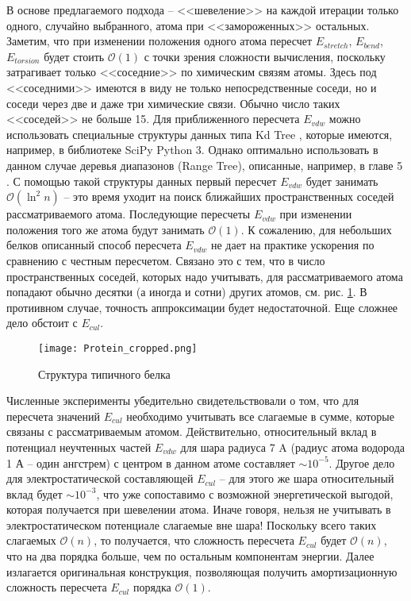   В основе предлагаемого подхода -- <<шевеление>> на каждой итерации только 
  одного, случайно выбранного, атома при <<замороженных>> остальных. Заметим, 
  что при изменении положения одного атома пересчет $E_{stretch} $, $E_{bend} 
  $, $E_{torsion} $ будет стоить $\mathcal{O}\left( 1 \right)$ с точки зрения сложности вычисления, поскольку 
  затрагивает только <<соседние>> по химическим связям атомы. Здесь под <<соседними>> 
  имеются в виду не только непосредственные соседи, но и соседи через две и даже три химические связи. Обычно число таких 
  <<соседей>> не больше 15. Для приближенного пересчета $E_{vdw} $ можно использовать 
  специальные структуры данных типа Kd Tree \cite{de2000computational}, которые имеются, например, в 
  библиотеке SciPy Python 3. Однако оптимально использовать в данном случае 
  деревья диапазонов (Range Tree), описанные, например, в главе 5 \cite{de2000computational}. С помощью такой структуры данных первый пересчет $E_{vdw} $ будет занимать 
  $\mathcal{O}\left( {\ln ^2n} \right)$ -- это время уходит на поиск ближайших 
  пространственных соседей рассматриваемого атома. Последующие пересчеты 
  $E_{vdw} $ при изменении положения того же атома будут занимать $\mathcal{
  O}\left( 1 \right)$. К сожалению, для небольших белков описанный способ пересчета $E_{vdw}$ не дает на практике ускорения по сравнению с честным пересчетом. Связано это с тем, что в число пространственных соседей, которых надо учитывать, для рассматриваемого атома попадают обычно десятки (а иногда и сотни) других атомов, см. рис. \ref{belok}. В протиивном случае, точность аппроксимации будет недостаточной. Еще сложнее дело обстоит с $E_{cul} $. 

  \begin{figure}
  \begin{center}
  \texttt{[image: Protein\_cropped.png]}
  \end{center}
  \caption{Структура типичного белка}
  \label{belok}
  \end{figure}
   
  Численные эксперименты убедительно свидетельствовали о том, что для пересчета значений $E_{cul} $ необходимо учитывать все слагаемые в сумме, которые связаны с рассматриваемым атомом. Действительно, относительный вклад в потенциал неучтенных частей $E_{vdw}$ для шара радиуса 7 A (радиус атома водорода 1 А -- один ангстрем) с центром в данном атоме составляет $\sim 10^{-5}$. Другое дело для электростатической составляющей $E_{cul}$ -- для этого же шара относительный вклад будет $\sim 10^{-3}$, что уже сопоставимо с возможной энергетической выгодой, которая получается при шевелении атома. Иначе говоря, нельзя не учитывать в электростатическом потенциале слагаемые вне шара! Поскольку всего таких слагаемых 
  $\mathcal{O}\left( n \right)$, то получается, что сложность пересчета $E_{cul} $ будет $\mathcal{O}\left( n \right)$, что на два порядка больше, чем по остальным 
  компонентам энергии. Далее излагается  оригинальная конструкция, позволяющая получить амортизационную сложность пересчета 
  $E_{cul} $ порядка $\mathcal{O}\left( 1 \right)$. 


